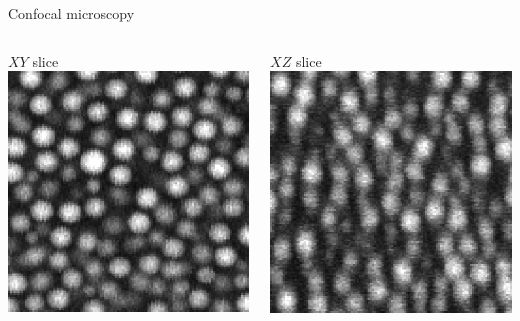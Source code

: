 \begin{frame}{Confocal microscopy}
	\begin{columns}
	\def\svgwidth{\columnwidth}
	\centering
	$XY$ slice\quad\includegraphics[width=0.5\columnwidth]{sliceXY}  
	
	\bigskip
	$XZ$ slice\quad\includegraphics[width=0.5\columnwidth]{sliceXZ}
	\end{columns}
\end{frame}

